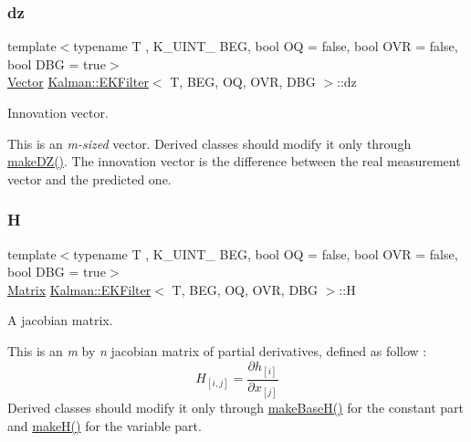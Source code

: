 \subsubsection{\texorpdfstring{dz}{dz}}
{\footnotesize\ttfamily template$<$typename T , K\+\_\+\+U\+I\+N\+T\+\_ B\+EG, bool OQ = false, bool O\+VR = false, bool D\+BG = true$>$ \\
\mbox{\hyperlink{classKalman_1_1EKFilter_af773d1217ecb01925b857d49b32bc636}{Vector}} \mbox{\hyperlink{classKalman_1_1EKFilter}{Kalman\+::\+E\+K\+Filter}}$<$ T, B\+EG, OQ, O\+VR, D\+BG $>$\+::dz\hspace{0.3cm}{\ttfamily [protected]}}



Innovation vector. 

This is an {\itshape m-\/sized} vector. Derived classes should modify it only through {\ttfamily \mbox{\hyperlink{classKalman_1_1EKFilter_a54a168299879f6b3023b0a42b1afe29d}{make\+D\+Z()}}}. The innovation vector is the difference between the real measurement vector and the predicted one. \mbox{\label{classKalman_1_1EKFilter_ac10c3f39cdcb10bf3bcf30f48efdb48d}} 
\subsubsection{\texorpdfstring{H}{H}}
{\footnotesize\ttfamily template$<$typename T , K\+\_\+\+U\+I\+N\+T\+\_ B\+EG, bool OQ = false, bool O\+VR = false, bool D\+BG = true$>$ \\
\mbox{\hyperlink{classKalman_1_1EKFilter_a7cbc4cb4d9139a7f241b27110426af43}{Matrix}} \mbox{\hyperlink{classKalman_1_1EKFilter}{Kalman\+::\+E\+K\+Filter}}$<$ T, B\+EG, OQ, O\+VR, D\+BG $>$\+::H\hspace{0.3cm}{\ttfamily [protected]}}



A jacobian matrix. 

This is an {\itshape m} by {\itshape n} jacobian matrix of partial derivatives, defined as follow \+: \[ H_{[i,j]} = \frac{\partial h_{[i]}}{\partial x_{[j]}} \] Derived classes should modify it only through {\ttfamily \mbox{\hyperlink{classKalman_1_1EKFilter_a2acc1502881abeb70155762fe3e3a644}{make\+Base\+H()}}} for the constant part and {\ttfamily \mbox{\hyperlink{classKalman_1_1EKFilter_a357df3cc6833241d5430c58feaed14ed}{make\+H()}}} for the variable part. \mbox{\label{classKalman_1_1EKFilter_a1f25e9c8bce9efb50cf3c3a5f3ba6822}} 
